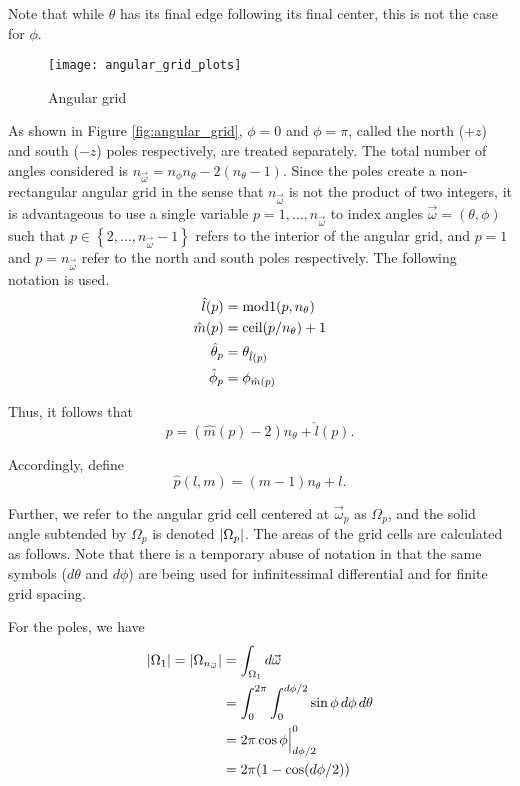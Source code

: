 Note that while $\theta$ has its final edge following its final center, this is
not the case for $\phi$.

\begin{figure}[h]
  \centering
  \texttt{[image: angular\_grid\_plots]}
  \caption{Angular grid}
\end{figure}

As shown in Figure \ref{fig:angular_grid}, $\phi=0$ and $\phi=\pi$, called
the north ($+z$) and south ($-z$) poles respectively, are treated separately.
The total number of angles considered is $n_{\vec{\omega}} = n_\phi n_\theta -
2(n_\theta-1)$.
Since the poles create a non-rectangular angular grid in the sense that
$n_{\vec{\omega}}$ is not the product of two integers, it is advantageous to use
a single variable $p=1,\ldots,n_{\vec{\omega}}$ to index angles $\vec{\omega} =
(\theta, \phi)$ such that $p \in \left\{ 2,\ldots,n_{\vec{\omega}}-1 \right\}$ refers to the interior
of the angular grid, and $p=1$ and $p=n_{\vec{\omega}}$ refer to the
north and south poles respectively.
The following notation is used.
\begin{align}
  \hat{l}(p) &= \mbox{mod1}(p, n_\theta) \\
  \hat{m}(p) &= \mbox{ceil}(p/n_\theta) + 1 \\
  \hat{\theta}_p &= \theta_{\hat{l}(p)} \\
  \hat{\phi}_p &= \phi_{\hat{m}(p)}
\end{align}

Thus, it follows that
\begin{equation}
  p = \left( \hat{m}(p)-2\right)n_\theta + \hat{l}(p).
\end{equation}

Accordingly, define
\begin{equation}
  \hat{p}(l,m) = (m-1)n_\theta + l.
\end{equation}

Further, we refer to the angular grid cell centered at $\vec{\omega}_p$ as $\Omega_p$, and the solid angle subtended by $\Omega_p$ is denoted $\left| \Omega_p \right|$.
The areas of the grid cells are calculated as follows.
Note that there is a temporary abuse of notation in that the same symbols ($d\theta$ and $d\phi$) are being used for infinitessimal differential and for finite grid spacing.

For the poles, we have
\begin{align}
  \left| \Omega_1 \right| = \left| \Omega_{n_{\vec{\omega}}} \right| &= \int_{\Omega_1} d{\vec{\omega}} \\
  &= \int_0^{2\pi}\int_0^{d\phi/2} \sin\phi\, d\phi\, d\theta \\
  &= 2\pi \cos\phi \Big|_{d\phi/2}^0 \\
  &= 2\pi(1-\cos(d\phi/2))
\end{align}

